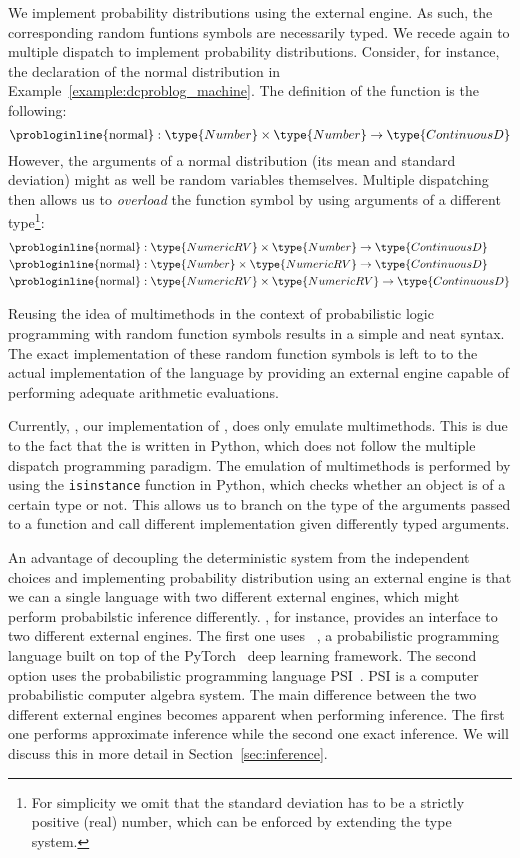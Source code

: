 We implement probability distributions using the external engine. As such, the corresponding random funtions symbols are necessarily typed. We recede again to multiple dispatch to implement probability distributions.
Consider, for instance, the declaration of the normal distribution in Example~\ref{example:dcproblog_machine}.
The definition of the function is the following:
$$ \text{\probloginline{normal}}: \type{Number} \times \type{Number} \rightarrow \type{ContinuousD}$$
However, the arguments of a normal distribution (its mean and standard deviation) might as well be random variables themselves.
Multiple dispatching then allows us to {\em overload} the  function symbol by using arguments of a different type\footnote{For simplicity we omit that the standard deviation has to be a strictly positive (real) number, which can be enforced by extending the type system.}:
\begin{align*}
	\text{\probloginline{normal}}&: \type{NumericRV} \times \type{Number} \rightarrow \type{ContinuousD} \\
	\text{\probloginline{normal}}&: \type{Number} \times \type{NumericRV} \rightarrow \type{ContinuousD} \\
	\text{\probloginline{normal}}&: \type{NumericRV} \times \type{NumericRV} \rightarrow \type{ContinuousD}
\end{align*}

Reusing the idea of multimethods in the context of probabilistic logic programming with random function symbols results in a simple and neat syntax.
The exact implementation of these random function symbols is left to to the actual implementation of the language by providing an external engine capable of performing adequate arithmetic evaluations.

Currently, \dcproblogsys, our implementation of \dcproblogsty, does only emulate multimethods. This is due to the fact that the \dcproblogsys is written in Python, which does not follow the multiple dispatch programming paradigm. The emulation of multimethods is performed by using the \verb|isinstance| function in Python, which checks whether an object is of a certain type or not. This allows us to branch on the type of the arguments passed to a function and call different implementation given differently typed arguments.

An advantage of decoupling the deterministic system from the independent choices and implementing probability distribution using an external engine is that we can a single language with two different external engines, which might perform probabilstic inference differently.
\dcproblogsys, for instance, provides an interface to two different external engines. The first one uses \pyrosty~\citep{bingham2019pyro}, a probabilistic programming language built on top of the PyTorch~\citep{paszke2019pytorch} deep learning framework.
The second option uses the probabilistic programming language PSI~\citep{gehr2016psi}. PSI is a computer probabilistic computer algebra system. The main difference between the two different external engines becomes apparent when performing inference. The first one performs approximate inference while the second one exact inference. We will discuss this in more detail in Section~\ref{sec:inference}.
